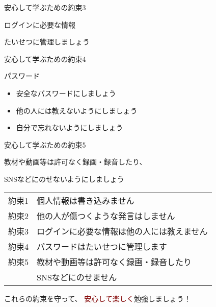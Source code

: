 \documentclass[
  ignorenonframetext,
  aspectratio=169,
  xcolor=dvipsnames]{beamer}
\providecommand{\tightlist}{%
  \setlength{\itemsep}{0pt}\setlength{\parskip}{0pt}}
\begin{document}
\begin{frame}{安心して学ぶための約束3}
\label{ux5b89ux5fc3ux3057ux3066ux5b66ux3076ux305fux3081ux306eux7d04ux675f3}
\LARGE

ログインに必要な情報

\pause
\bigskip

\raggedleft

たいせつに管理しましょう
\end{frame}

\begin{frame}{安心して学ぶための約束4}
\label{ux5b89ux5fc3ux3057ux3066ux5b66ux3076ux305fux3081ux306eux7d04ux675f4}
\LARGE

パスワード

\pause

\begin{itemize}[<+->]
\tightlist
\item
  安全なパスワードにしましょう
\item
  他の人には教えないようにしましょう
\item
  自分で忘れないようにしましょう
\end{itemize}
\end{frame}

\begin{frame}{安心して学ぶための約束5}
\label{ux5b89ux5fc3ux3057ux3066ux5b66ux3076ux305fux3081ux306eux7d04ux675f5}
\LARGE

教材や動画等は許可なく録画・録音したり、

SNSなどにのせないようにしましょう
\end{frame}

\begin{frame}{}
\label{section-2}
\Large

\begin{tabular}{ll}
約束1& 個人情報は書き込みません\\
約束2& 他の人が傷つくような発言はしません\\
約束3& ログインに必要な情報は他の人には教えません\\
約束4& パスワードはたいせつに管理します\\
約束5& 教材や動画等は許可なく録画・録音したり\\
&      SNSなどにのせません
\end{tabular}

\vfill

これらの\textcolor{NavyBlue}{約束を守って}、
\textcolor{Maroon}{安心して楽しく}勉強しましょう！
\end{frame}
\end{document}
